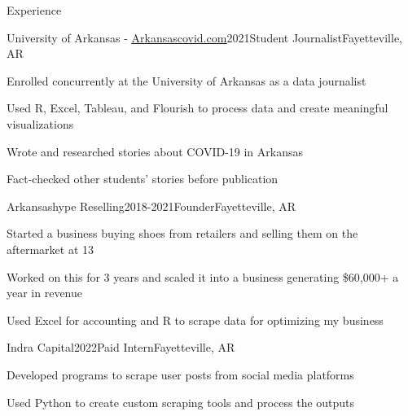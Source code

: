 \documentclass{resume}
\begin{document}
    \begin{rSection}{Experience}
        \begin{rSubsection}{University of Arkansas - \href{https://web.archive.org/web/20210426215910/https://arkansascovid.com/}{\underline{Arkansascovid.com}}}{2021}{Student Journalist}{Fayetteville, AR}
            \item Enrolled concurrently at the University of Arkansas as a data journalist
            \item Used R, Excel, Tableau, and Flourish to process data and create meaningful visualizations
            \item Wrote and researched stories about COVID-19 in Arkansas
            \item Fact-checked other students' stories before publication
        \end{rSubsection}
      
        \begin{rSubsection}{Arkansashype Reselling}{2018-2021}{Founder}{Fayetteville, AR}
            \item Started a business buying shoes from retailers and selling them on the aftermarket at 13
            \item Worked on this for 3 years and scaled it into a business generating \$60,000+ a year in revenue
            \item Used Excel for accounting and R to scrape data for optimizing my business
        \end{rSubsection}
        \begin{rSubsection}{Indra Capital}{2022}{Paid Intern}{Fayetteville, AR}
            \item Developed programs to scrape user posts from social media platforms
            \item Used Python to create custom scraping tools and process the outputs
        \end{rSubsection}
    \end{rSection}
\end{document}
